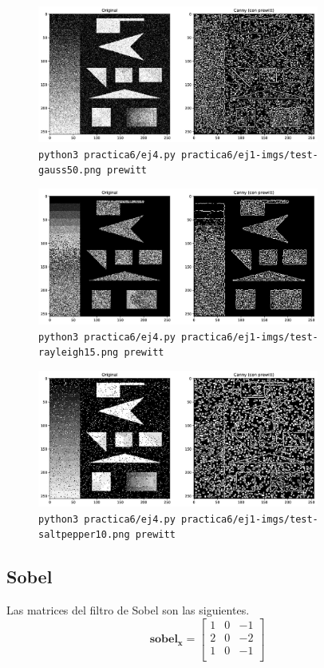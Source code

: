 \documentclass[11pt, spanish]{article}
\begin{document}
\begin{figure}[H]
\centering
    \includegraphics[height=4.5cm]{informe-imgs/ej4-prewitt-test-gauss50.jpg}
    \caption{\texttt{python3 practica6/ej4.py practica6/ej1-imgs/test-gauss50.png prewitt}}
\end{figure}

\begin{figure}[H]
\centering
    \includegraphics[height=4.5cm]{informe-imgs/ej4-prewitt-test-rayleigh15.jpg}
    \caption{\texttt{python3 practica6/ej4.py practica6/ej1-imgs/test-rayleigh15.png prewitt}}
\end{figure}

\begin{figure}[H]
\centering
    \includegraphics[height=4.5cm]{informe-imgs/ej4-prewitt-test-saltpepper10.jpg}
    \caption{\texttt{python3 practica6/ej4.py practica6/ej1-imgs/test-saltpepper10.png prewitt}}
\end{figure}



\newpage
\subsection{Sobel}
Las matrices del filtro de Sobel son las siguientes.
\[
\mathbf{sobel_x} = \begin{bmatrix} 
1 & 0 & -1 \\
2 & 0 & -2 \\
1 & 0 & -1 \\
\end{bmatrix}
\]
\end{document}
